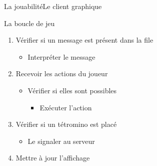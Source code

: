\documentclass[french]{beamer}
\begin{document}
		\begin{frame}{La jouabilité}{Le client graphique}
			\begin{block}{La boucle de jeu}				
				\begin{enumerate}
					\item Vérifier si un message est présent dans la file
						\begin{itemize}
							\item Interpréter le message
						\end{itemize}
					\item Recevoir les actions du joueur
						\begin{itemize}
							\item Vérifier si elles sont possibles
							\begin{itemize}
								\item Exécuter l'action
							\end{itemize}
						\end{itemize}

					\item Vérifier si un tétromino est placé
						\begin{itemize}
							\item Le signaler au serveur
						\end{itemize}

					\item Mettre à jour l'affichage
				\end{enumerate}
			\end{block}
		\end{frame}
\end{document}
